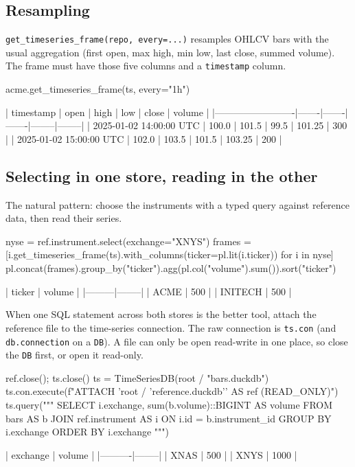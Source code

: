\documentclass[11pt,a4paper]{article}
\newcommand{\code}[1]{\texttt{#1}}
\begin{document}
\subsection{Resampling}

\code{get\_timeseries\_frame(repo, every=...)} resamples OHLCV bars with the usual
aggregation (first open, max high, min low, last close, summed volume). The frame must
have those five columns and a \code{timestamp} column.

\begin{python}
acme.get_timeseries_frame(ts, every="1h")
\end{python}
\begin{console}
| timestamp               | open  | high  | low   | close  | volume |
|-------------------------|-------|-------|-------|--------|--------|
| 2025-01-02 14:00:00 UTC | 100.0 | 101.5 | 99.5  | 101.25 | 300    |
| 2025-01-02 15:00:00 UTC | 102.0 | 103.5 | 101.5 | 103.25 | 200    |
\end{console}

\subsection{Selecting in one store, reading in the other}

The natural pattern: choose the instruments with a typed query against reference data,
then read their series.

\begin{python}
nyse = ref.instrument.select(exchange="XNYS")
frames = [i.get_timeseries_frame(ts).with_columns(ticker=pl.lit(i.ticker)) for i in nyse]
pl.concat(frames).group_by("ticker").agg(pl.col("volume").sum()).sort("ticker")
\end{python}
\begin{console}
| ticker  | volume |
|---------|--------|
| ACME    | 500    |
| INITECH | 500    |
\end{console}

When one SQL statement across both stores is the better tool, attach the reference file
to the time-series connection. The raw connection is \code{ts.con} (and
\code{db.connection} on a \code{DB}). A file can only be open read-write in one place, so
close the \code{DB} first, or open it read-only.

\begin{python}
ref.close(); ts.close()
ts = TimeSeriesDB(root / "bars.duckdb")
ts.con.execute(f"ATTACH '{root / 'reference.duckdb'}' AS ref (READ_ONLY)")
ts.query("""
    SELECT i.exchange, sum(b.volume)::BIGINT AS volume
    FROM bars AS b JOIN ref.instrument AS i ON i.id = b.instrument_id
    GROUP BY i.exchange ORDER BY i.exchange
""")
\end{python}
\begin{console}
| exchange | volume |
|----------|--------|
| XNAS     | 500    |
| XNYS     | 1000   |
\end{console}
\end{document}
